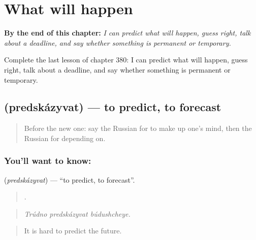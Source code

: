 
\chapter{What will happen}
\label{ch:ru-what-will-happen}

\begin{chapteropening}
\textbf{By the end of this chapter:} \emph{I can predict what will happen, guess right, talk about a deadline, and say whether something is permanent or temporary.}

Complete the last lesson of chapter 380: I can predict what will happen, guess right, talk about a deadline, and say whether something is permanent or temporary.
\end{chapteropening}

\section[\texorpdfstring{\ru{предсказывать} (predskázyvat)}{предсказывать (predskázyvat)}]{ (predskázyvat) — to predict, to forecast}

\label{lesson:RU-C380-predskazyvat}



\begin{quote}
Before the new one: say the Russian for to make up one’s mind, then the Russian for depending on.
\end{quote}

\subsection*{You'll want to know: }
\textbf{} (\emph{predskázyvat}) — \textquotedblleft{}to predict, to forecast\textquotedblright{}.

\begin{quote}
  .
\end{quote}

\begin{quote}
\emph{Trúdno predskázyvat búdushcheye.}
\end{quote}

\begin{quote}
It is hard to predict the future.
\end{quote}


